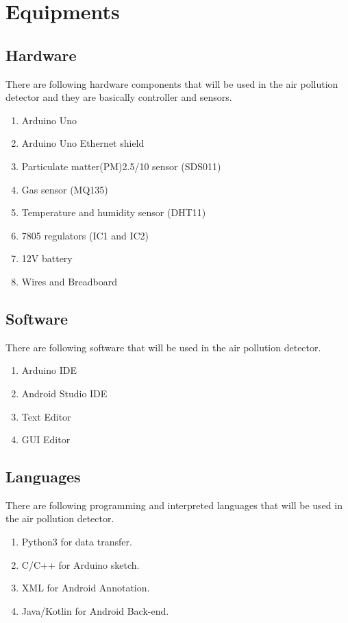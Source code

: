 \chapter{Equipments}

\section{Hardware}

There are following hardware components that will be used in the air pollution detector and they are basically controller and sensors.

\begin{enumerate}
	\item {Arduino Uno}
	\item {Arduino Uno Ethernet shield}
	\item {Particulate matter(PM)2.5/10 sensor (SDS011)}
	\item {Gas sensor (MQ135)}
	\item {Temperature and humidity sensor (DHT11)}
	\item {7805 regulators (IC1 and IC2)}
	\item {12V battery}
	\item {Wires and Breadboard}
\end{enumerate}


\section{Software}

There are following software that will be used in the air pollution detector.

\begin{enumerate}
	\item {Arduino IDE}
	\item {Android Studio IDE}
	\item {Text Editor}
	\item {GUI Editor}
\end{enumerate}

\section{Languages}

There are following programming and interpreted languages that will be used in the air pollution detector.

\begin{enumerate}
	\item Python3 for data transfer.
	\item C/C++ for Arduino sketch.
	\item XML for Android Annotation.
	\item Java/Kotlin for Android Back-end.
\end{enumerate}


